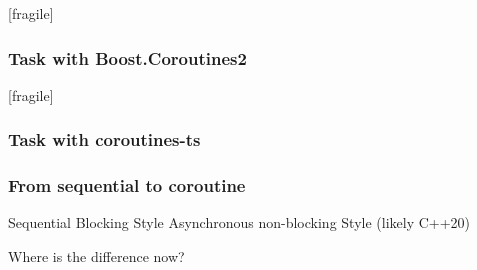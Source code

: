 \begin{frame}{[fragile]}
  \frametitle{Task with Boost.Coroutines2}
\end{frame}%
\begin{frame}{[fragile]}
    \frametitle{Task with coroutines-ts}
\end{frame}%

\begin{frame}[fragile]
  \frametitle{From sequential to coroutine}
  Sequential Blocking Style
  \vspace{8mm}
  Asynchronous non-blocking Style (likely C++20)
  \vspace{8mm}

  Where is the difference now?
\end{frame}
